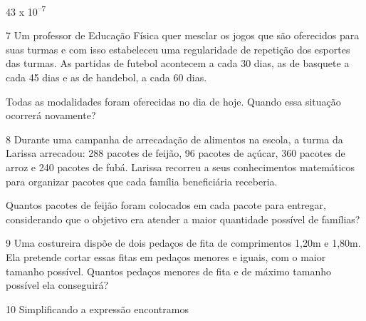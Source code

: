 \begin{escolha}
\begin{minipage}{.5\textwidth}
\begin{escolha}
  \item 43 x 10\textsuperscript{--7} 
\end{escolha}
\end{minipage}

\num{7} Um professor de Educação Física quer mesclar os jogos que são
oferecidos para suas turmas e com isso estabeleceu uma regularidade de
repetição dos esportes das turmas. As partidas de futebol acontecem a 
cada 30 dias, as de basquete a cada 45 dias e as de handebol, a cada 60 dias.

Todas as modalidades foram oferecidas no dia de hoje. Quando essa
situação ocorrerá novamente?

\begin{boxpeq}
\end{boxpeq}

\num{8} Durante uma campanha de arrecadação de alimentos na escola,
a turma da Larissa arrecadou: 288 pacotes de feijão, 96 pacotes de açúcar,
360 pacotes de arroz e 240 pacotes de fubá. Larissa recorreu a seus
conhecimentos matemáticos para organizar pacotes que cada família
beneficiária receberia.

Quantos pacotes de feijão foram colocados em cada pacote para entregar,
considerando que o objetivo era atender a maior quantidade possível de
famílias?

\begin{boxmedio}
\end{boxmedio}

\num{9} Uma costureira dispõe de dois pedaços de fita de comprimentos
1,20m e 1,80m. Ela pretende cortar essas fitas em pedaços menores e 
iguais, com o maior tamanho possível. Quantos pedaços menores de fita 
e de máximo tamanho possível ela conseguirá?

\begin{boxpeq}
\end{boxpeq}

\num{10} Simplificando a expressão  encontramos


\end{escolha}
